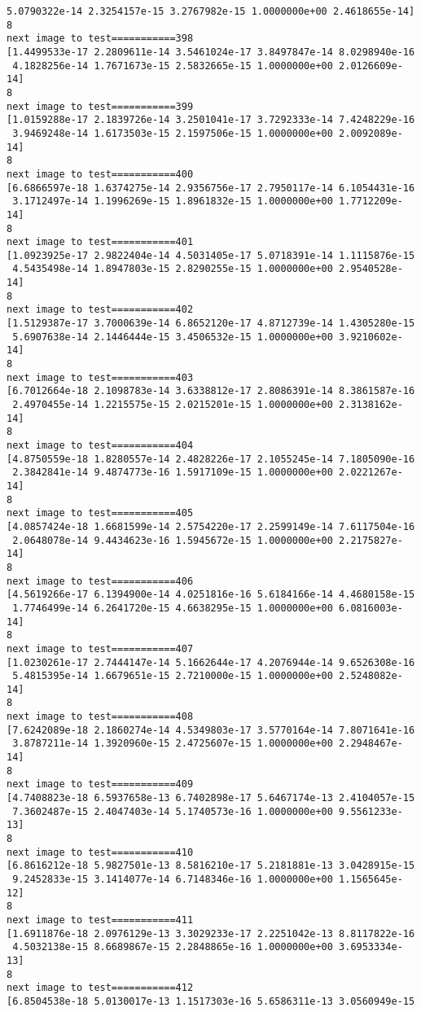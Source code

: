 \documentclass[11pt]{article}
\begin{document}
\begin{Verbatim}[commandchars=\\\{\}]
 5.0790322e-14 2.3254157e-15 3.2767982e-15 1.0000000e+00 2.4618655e-14]
8
next image to test===========398
[1.4499533e-17 2.2809611e-14 3.5461024e-17 3.8497847e-14 8.0298940e-16
 4.1828256e-14 1.7671673e-15 2.5832665e-15 1.0000000e+00 2.0126609e-14]
8
next image to test===========399
[1.0159288e-17 2.1839726e-14 3.2501041e-17 3.7292333e-14 7.4248229e-16
 3.9469248e-14 1.6173503e-15 2.1597506e-15 1.0000000e+00 2.0092089e-14]
8
next image to test===========400
[6.6866597e-18 1.6374275e-14 2.9356756e-17 2.7950117e-14 6.1054431e-16
 3.1712497e-14 1.1996269e-15 1.8961832e-15 1.0000000e+00 1.7712209e-14]
8
next image to test===========401
[1.0923925e-17 2.9822404e-14 4.5031405e-17 5.0718391e-14 1.1115876e-15
 4.5435498e-14 1.8947803e-15 2.8290255e-15 1.0000000e+00 2.9540528e-14]
8
next image to test===========402
[1.5129387e-17 3.7000639e-14 6.8652120e-17 4.8712739e-14 1.4305280e-15
 5.6907638e-14 2.1446444e-15 3.4506532e-15 1.0000000e+00 3.9210602e-14]
8
next image to test===========403
[6.7012664e-18 2.1098783e-14 3.6338812e-17 2.8086391e-14 8.3861587e-16
 2.4970455e-14 1.2215575e-15 2.0215201e-15 1.0000000e+00 2.3138162e-14]
8
next image to test===========404
[4.8750559e-18 1.8280557e-14 2.4828226e-17 2.1055245e-14 7.1805090e-16
 2.3842841e-14 9.4874773e-16 1.5917109e-15 1.0000000e+00 2.0221267e-14]
8
next image to test===========405
[4.0857424e-18 1.6681599e-14 2.5754220e-17 2.2599149e-14 7.6117504e-16
 2.0648078e-14 9.4434623e-16 1.5945672e-15 1.0000000e+00 2.2175827e-14]
8
next image to test===========406
[4.5619266e-17 6.1394900e-14 4.0251816e-16 5.6184166e-14 4.4680158e-15
 1.7746499e-14 6.2641720e-15 4.6638295e-15 1.0000000e+00 6.0816003e-14]
8
next image to test===========407
[1.0230261e-17 2.7444147e-14 5.1662644e-17 4.2076944e-14 9.6526308e-16
 5.4815395e-14 1.6679651e-15 2.7210000e-15 1.0000000e+00 2.5248082e-14]
8
next image to test===========408
[7.6242089e-18 2.1860274e-14 4.5349803e-17 3.5770164e-14 7.8071641e-16
 3.8787211e-14 1.3920960e-15 2.4725607e-15 1.0000000e+00 2.2948467e-14]
8
next image to test===========409
[4.7408823e-18 6.5937658e-13 6.7402898e-17 5.6467174e-13 2.4104057e-15
 7.3602487e-15 2.4047403e-14 5.1740573e-16 1.0000000e+00 9.5561233e-13]
8
next image to test===========410
[6.8616212e-18 5.9827501e-13 8.5816210e-17 5.2181881e-13 3.0428915e-15
 9.2452833e-15 3.1414077e-14 6.7148346e-16 1.0000000e+00 1.1565645e-12]
8
next image to test===========411
[1.6911876e-18 2.0976129e-13 3.3029233e-17 2.2251042e-13 8.8117822e-16
 4.5032138e-15 8.6689867e-15 2.2848865e-16 1.0000000e+00 3.6953334e-13]
8
next image to test===========412
[6.8504538e-18 5.0130017e-13 1.1517303e-16 5.6586311e-13 3.0560949e-15

\end{Verbatim}
\end{document}
